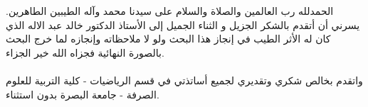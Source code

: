 الحمدلله رب العالمين والصلاة والسلام على سيدنا محمد وآله الطيبين الطاهرين. يسرني أن أتقدم بالشكر الجزيل و الثناء الجميل إلى الأستاذ الدكتور خالد عبد الاله الذي كان له الأثر الطيب في إنجاز هذا البحث ولو لا ملاحظاته وإنجازه لما خرج البحث بالصورة النهائية فجزاه الله خير الجزاء.\\
\\
واتقدم بخالص شكري وتقديري لجميع أساتذتي في قسم الرياضيات - كلية التربية للعلوم الصرفة - جامعة البصرة بدون استثناء.
